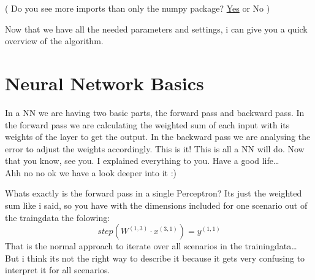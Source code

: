 \documentclass[
]{book}
\begin{document}
( Do you see more imports than only the numpy package? \href{https://www.youtube.com/watch?v=dQw4w9WgXcQ}{Yes} or No )

Now that we have all the needed parameters and settings, i can give you a quick overview of the algorithm.

\hypertarget{neural-network-basics}{%
\section{Neural Network Basics}\label{neural-network-basics}}

In a NN we are having two basic parts, the forward pass and backward pass. In the forward pass we are calculating the weighted sum of each input with its weights of the layer to get the output. In the backward pass we are analysing the error to adjust the weights accordingly. This is it! This is all a NN will do. Now that you know, see you. I explained everything to you. Have a good life\ldots{}\\
Ahh no no ok we have a look deeper into it :)

Whats exactly is the forward pass in a single Perceptron? Its just the weighted sum like i said, so you have with the dimensions included for one scenario out of the traingdata the folowing:
\[
  step(W^{(1,3)} \cdot x^{(3,1)}) = y^{(1,1)}
\]
That is the normal approach to iterate over all scenarios in the trainingdata\ldots{}\\
But i think its not the right way to describe it because it gets very confusing to interpret it for all scenarios.
\end{document}
